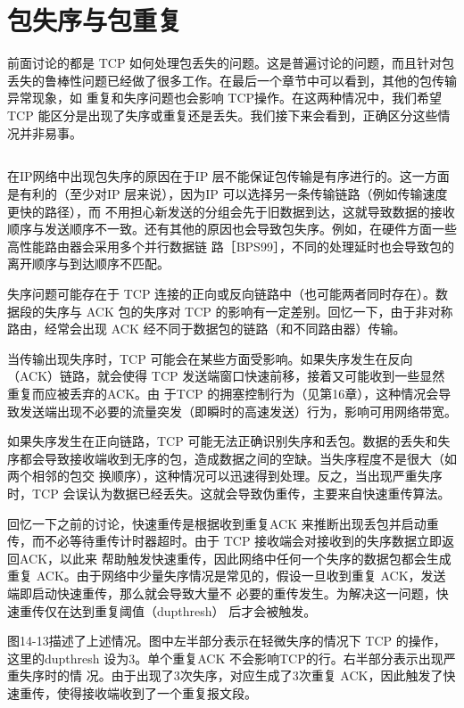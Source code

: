 \section{包失序与包重复}
前面讨论的都是 TCP 如何处理包丢失的问题。这是普遍讨论的问题，而且针对包丢失的鲁棒性问题已经做了很多工作。在最后一个章节中可以看到，其他的包传输异常现象，如
重复和失序问题也会影响 TCP操作。在这两种情况中，我们希望 TCP 能区分是出现了失序或重复还是丢失。我们接下来会看到，正确区分这些情况并非易事。

\subsection{}
在IP网络中出现包失序的原因在于IP 层不能保证包传输是有序进行的。这一方面是有利的（至少对IP 层来说），因为IP
可以选择另一条传输链路（例如传输速度更快的路径），而
不用担心新发送的分组会先于旧数据到达，这就导致数据的接收顺序与发送顺序不一致。还有其他的原因也会导致包失序。例如，在硬件方面一些高性能路由器会采用多个并行数据链
路［BPS99］，不同的处理延时也会导致包的离开顺序与到达顺序不匹配。

失序问题可能存在于 TCP 连接的正向或反向链路中（也可能两者同时存在）。数据段的失序与 ACK 包的失序对 TCP
的影响有一定差别。回忆一下，由于非对称路由，经常会出现
ACK 经不同于数据包的链路（和不同路由器）传输。

当传输出现失序时，TCP 可能会在某些方面受影响。如果失序发生在反向（ACK）链路，就会使得 TCP
发送端窗口快速前移，接着又可能收到一些显然重复而应被丢弃的ACK。由
于TCP 的拥塞控制行为（见第16章），这种情况会导致发送端出现不必要的流量突发（即瞬时的高速发送）行为，影响可用网络带宽。

如果失序发生在正向链路，TCP 可能无法正确识别失序和丢包。数据的丢失和失序都会导致接收端收到无序的包，造成数据之间的空缺。当失序程度不是很大（如两个相邻的包交
换顺序），这种情况可以迅速得到处理。反之，当出现严重失序时，TCP 会误认为数据已经丢失。这就会导致伪重传，主要来自快速重传算法。

回忆一下之前的讨论，快速重传是根据收到重复ACK 来推断出现丢包并启动重传，而不必等待重传计时器超时。由于 TCP
接收端会对接收到的失序数据立即返回ACK，以此来
帮助触发快速重传，因此网络中任何一个失序的数据包都会生成重复 ACK。由于网络中少量失序情况是常见的，假设一旦收到重复
ACK，发送端即启动快速重传，那么就会导致大量不
必要的重传发生。为解决这一问题，快速重传仅在达到重复阈值（dupthresh） 后才会被触发。

图14-13描述了上述情况。图中左半部分表示在轻微失序的情况下 TCP 的操作，这里的dupthresh 设为3。单个重复ACK
不会影响TCP的行。右半部分表示出现严重失序时的情
况。由于出现了3次失序，对应生成了3次重复 ACK，因此触发了快速重传，使得接收端收到了一个重复报文段。

